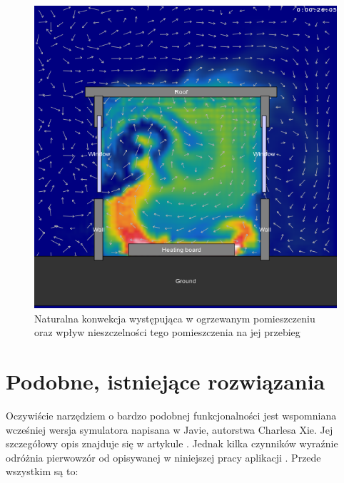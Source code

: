 \begin{figure}[!h]
\centering
\includegraphics[width=.6\textwidth]{img/fluidExample2}
\caption{Naturalna konwekcja występująca w ogrzewanym pomieszczeniu oraz wpływ 
nieszczelności tego pomieszczenia na jej przebieg}
\label{fig:fluidExample2}
\end{figure}

\section{Podobne, istniejące rozwiązania}

Oczywiście narzędziem o bardzo podobnej funkcjonalności jest wspomniana
wcześniej wersja symulatora \en napisana w Javie, autorstwa Charlesa Xie. Jej
szczegółowy opis znajduje się w artykule \cite{orgEnergy2D}. Jednak kilka
czynników wyraźnie odróżnia pierwowzór od opisywanej w niniejszej pracy
aplikacji \en. Przede wszystkim są to:

